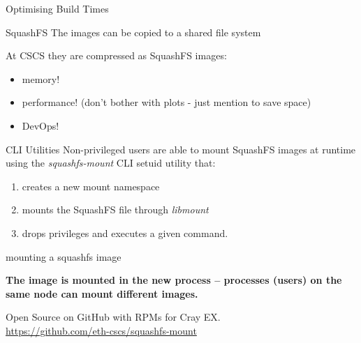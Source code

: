 \documentclass[aspectratio=43]{beamer}
\begin{document}
\begin{frame}[fragile]{Optimising Build Times}
    \begin{center}
        
    \end{center}
\end{frame}



\begin{frame}[fragile]{SquashFS}
    The images can be copied to a shared file system

    At CSCS they are compressed as SquashFS images:
    \begin{itemize}
        \item memory!
        \item performance! (don't bother with plots - just mention to save space)
        \item DevOps!
    \end{itemize}
\end{frame}

\begin{frame}[fragile]{CLI Utilities}
    Non-privileged users are able to mount SquashFS images at runtime using the \emph{squashfs-mount} CLI setuid utility that:
    \begin{enumerate}
    \item creates a new mount namespace
    \item mounts the SquashFS file through \emph{libmount}
    \item drops privileges and executes a given command.
    \end{enumerate}

    \begin{code}{mounting a squashfs image}

    \end{code}

    \begin{center}
        \textbf{The image is mounted in the new process -- processes (users) on the same node can mount different images.}
    \end{center}

    \vspace{10pt}

    Open Source on GitHub with RPMs for Cray EX.\\\url{https://github.com/eth-cscs/squashfs-mount}
\end{frame}
\end{document}
